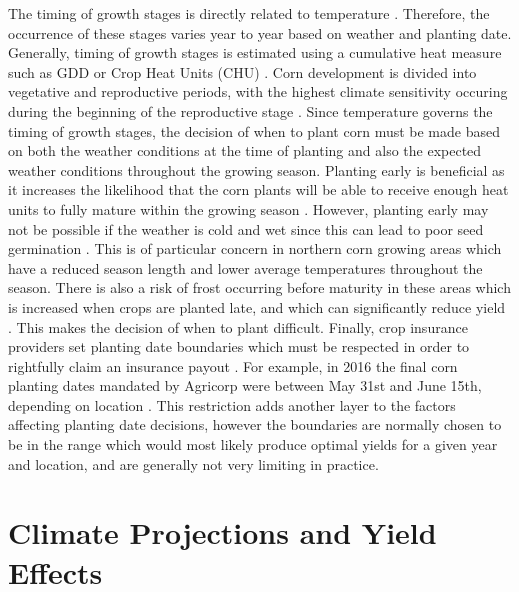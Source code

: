 The timing of growth stages is directly related to temperature \citep{OMAFRA, neild1987growing, hanway1966corn}. Therefore, the occurrence of these stages varies year to year based on weather and planting date. Generally, timing of growth stages is estimated using a cumulative heat measure such as GDD or Crop Heat Units (CHU)  \citep{neild1987growing, OMAFRA}. Corn development is divided into vegetative and reproductive periods, with the highest climate sensitivity occuring during the beginning of the reproductive stage \citep{lee2007corn, OMAFRA}. Since temperature governs the timing of growth stages, the decision of when to plant corn must be made based on both the weather conditions at the time of planting and also the expected weather conditions throughout the growing season. Planting early is beneficial as it increases the likelihood that the corn plants will be able to receive enough heat units to fully mature within the growing season \citep{OMAFRAplant}. However, planting early may not be possible if the weather is cold and wet since this can lead to poor seed germination \citep{neild1987growing}. This is of particular concern in northern corn growing areas which have a reduced season length and lower average temperatures throughout the season. There is also a risk of frost occurring before maturity  in these areas which is increased when crops are planted late, and which can significantly reduce yield \citep{OMAFRA}. This makes the decision of when to plant difficult. Finally, crop insurance providers set planting date boundaries which must be respected in order to rightfully claim an insurance payout \citep{Agri2016dates,edwards2012insurance}. For example, in 2016 the final corn planting dates mandated by Agricorp were between May 31st and June 15th, depending on location \citep{Agri2016dates}. This restriction adds another layer to the factors affecting planting date decisions, however the boundaries are normally chosen to be in the range which would most likely produce optimal yields for a given year and location, and are generally not very limiting in practice.


\section{Climate Projections and Yield Effects}

